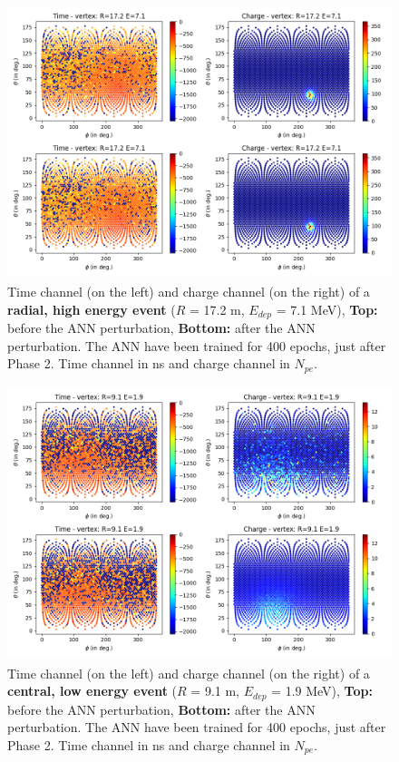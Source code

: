 \documentclass[../main.tex]{subfiles}
\begin{document}
\begin{figure}[ht]
  \centering
  \includegraphics[height=8cm]{images/janne/events/hr_he_400.png}
  \caption{Time channel (on the left) and charge channel (on the right) of a \textbf{radial, high energy event} ($R$ = 17.2 m, $E_{dep}$ = 7.1 MeV), \textbf{Top:} before the ANN perturbation, \textbf{Bottom:} after the ANN perturbation. The ANN have been trained for 400 epochs, just after Phase 2. Time channel in ns and charge channel in $N_{pe}$.}
  \label{fig:janne:hr_he_400}
\end{figure}

\begin{figure}[ht]
  \centering
  \includegraphics[height=8cm]{images/janne/events/lr_le_400.png}
  \caption{Time channel (on the left) and charge channel (on the right) of a \textbf{central, low energy event} ($R$ = 9.1 m, $E_{dep}$ = 1.9 MeV), \textbf{Top:} before the ANN perturbation, \textbf{Bottom:} after the ANN perturbation. The ANN have been trained for 400 epochs, just after Phase 2. Time channel in ns and charge channel in $N_{pe}$.}
  \label{fig:janne:lr_le_400}
\end{figure}
\end{document}
